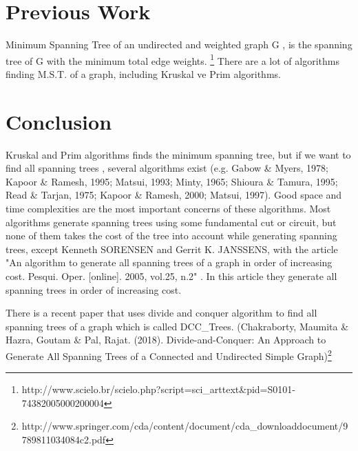 \documentclass[11pt]{article}
\begin{document}
\section{Previous Work}
Minimum Spanning Tree of an undirected and weighted graph G , is the spanning tree of G with the minimum  total edge weights. \footnote{http://www.scielo.br/scielo.php?script=sci\_arttext\&pid=S0101-74382005000200004} There are a lot of algorithms finding M.S.T. of a graph, including Kruskal ve Prim algorithms. 
 
\section{Conclusion}
Kruskal and Prim algorithms finds the minimum spanning tree, but if we want to find all spanning trees , several algorithms exist (e.g. Gabow \& Myers, 1978; Kapoor \& Ramesh, 1995; Matsui, 1993; Minty, 1965; Shioura \& Tamura, 1995; Read \& Tarjan, 1975; Kapoor \& Ramesh, 2000; Matsui, 1997). Good space and time complexities are the most important concerns of these algorithms. Most algorithms generate spanning trees using some fundamental cut or circuit, but none of them takes the cost of the tree into account while generating spanning trees, except Kenneth SORENSEN  and  Gerrit K. JANSSENS,  with the article "An algorithm to generate all spanning trees of a graph in order of increasing cost. Pesqui. Oper. [online]. 2005, vol.25, n.2" . In this article they generate all spanning trees in order of increasing cost.

There is a recent paper that uses divide and conquer algorithm to find all spanning trees of a graph which is called DCC\_Trees. (Chakraborty, Maumita \& Hazra, Goutam \& Pal, Rajat. (2018). Divide-and-Conquer: An Approach to Generate All Spanning Trees of a Connected and Undirected Simple Graph)\footnote{http://www.springer.com/cda/content/document/cda\_downloaddocument/9789811034084\-c2.pdf}
\end{document}
